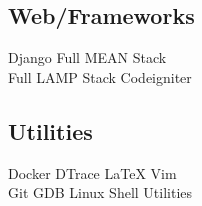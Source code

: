 \documentclass[]{deedy-resume-openfont}
\begin{document}
\begin{minipage}[t]{0.30\textwidth}
\subsection{Web/Frameworks}
Django \textbullet{} Full MEAN Stack \\
Full LAMP Stack \textbullet{} Codeigniter \\
\vspace{0.4 cm}
\subsection{Utilities}
Docker \textbullet{} DTrace \textbullet{} \LaTeX{} \textbullet{} Vim \\
Git \textbullet{} GDB \textbullet{} Linux Shell Utilities \\


%
%

\end{minipage}
\hfill
\end{document}
